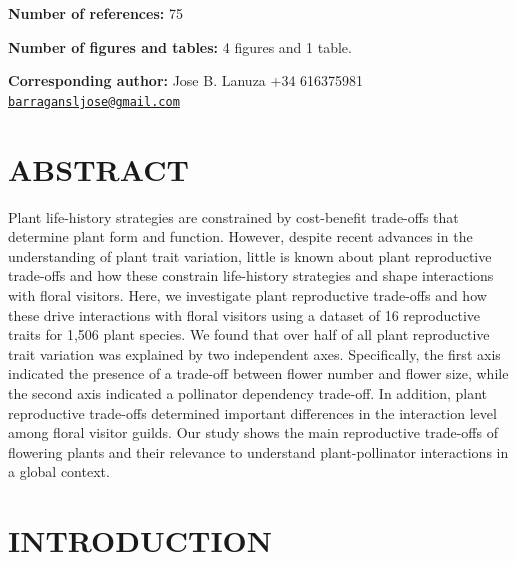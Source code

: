 \documentclass[
  12pt,
  a4paper,
]{article}
\begin{document}
\textbf{Number of references:} 75

\textbf{Number of figures and tables:} 4 figures and 1 table.

\textbf{Corresponding author:} Jose B. Lanuza \textbar{} +34 616375981\textbar{} \href{mailto:barragansljose@gmail.com}{\nolinkurl{barragansljose@gmail.com}}

\newpage

\hypertarget{abstract}{%
\section{ABSTRACT}\label{abstract}}

Plant life-history strategies are constrained by cost-benefit trade-offs that determine plant form and function. However, despite recent advances in the understanding of plant trait variation, little is known about plant reproductive trade-offs and how these constrain life-history strategies and shape interactions with floral visitors. Here, we investigate plant reproductive trade-offs and how these drive interactions with floral visitors using a dataset of 16 reproductive traits for 1,506 plant species. We found that over half of all plant reproductive trait variation was explained by two independent axes. Specifically, the first axis indicated the presence of a trade-off between flower number and flower size, while the second axis indicated a pollinator dependency trade-off. In addition, plant reproductive trade-offs determined important differences in the interaction level among floral visitor guilds. Our study shows the main reproductive trade-offs of flowering plants and their relevance to understand plant-pollinator interactions in a global context.

\newpage

\doublespacing
\vspace{5mm}
\normalsize

\hypertarget{introduction}{%
\section{INTRODUCTION}\label{introduction}}
\end{document}
